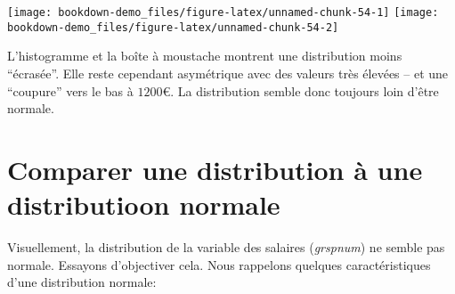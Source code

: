\documentclass[
]{book}
\newenvironment{Shaded}{\begin{snugshade}}{\end{snugshade}}
\newcommand{\AttributeTok}[1]{\textcolor[rgb]{0.77,0.63,0.00}{#1}}
\newcommand{\CommentTok}[1]{\textcolor[rgb]{0.56,0.35,0.01}{\textit{#1}}}
\newcommand{\FunctionTok}[1]{\textcolor[rgb]{0.00,0.00,0.00}{#1}}
\newcommand{\NormalTok}[1]{#1}
\newcommand{\SpecialCharTok}[1]{\textcolor[rgb]{0.00,0.00,0.00}{#1}}
\newcommand{\StringTok}[1]{\textcolor[rgb]{0.31,0.60,0.02}{#1}}
\begin{document}
\begin{Shaded}
\end{Shaded}

\texttt{[image: bookdown-demo\_files/figure-latex/unnamed-chunk-54-1]} \texttt{[image: bookdown-demo\_files/figure-latex/unnamed-chunk-54-2]}

L'histogramme et la boîte à moustache montrent une distribution moins ``écrasée''. Elle reste cependant asymétrique avec des valeurs très élevées -- et une ``coupure'' vers le bas à \(1200€\). La distribution semble donc toujours loin d'être normale.

\hypertarget{comparer-une-distribution-uxe0-une-distributioon-normale}{%
\section{Comparer une distribution à une distributioon normale}\label{comparer-une-distribution-uxe0-une-distributioon-normale}}

Visuellement, la distribution de la variable des salaires (\emph{grspnum}) ne semble pas normale. Essayons d'objectiver cela. Nous rappelons quelques caractéristiques d'une distribution normale:
\end{document}
